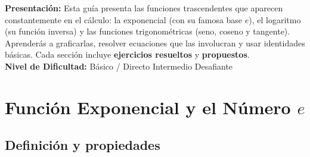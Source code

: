 \documentclass[12pt, a4paper]{article}
\begin{document}


\vspace{4pt}
\begin{cuadroinfo}
  \small
  \textbf{Presentación:} Esta guía presenta las funciones trascendentes que aparecen constantemente en el cálculo: la exponencial (con su famosa base $e$), el logaritmo (su función inversa) y las funciones trigonométricas (seno, coseno y tangente). Aprenderás a graficarlas, resolver ecuaciones que las involucran y usar identidades básicas. Cada sección incluye \textbf{ejercicios resueltos} y \textbf{propuestos}.
  \\[4pt]
  \textbf{Nivel de Dificultad:}\quad
  \facil{} Básico / Directo \quad
  \medio{} Intermedio \quad
  \dificil{} Desafiante
\end{cuadroinfo}

\vspace{8pt}

\section{Función Exponencial y el Número $e$}

\subsection{Definición y propiedades}
\end{document}
